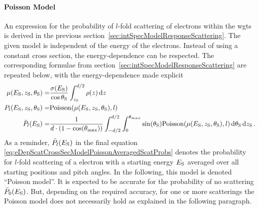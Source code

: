 \paragraph{Poisson Model}
An expression for the probability of $l$-fold scattering of electrons within the \gls{wgts} is derived in the previous section~\ref{sec:intSpecModelResponseScattering}. The given model is independent of the energy of the electrons. Instead of using a constant cross section, the energy-dependence can be respected. The corresponding formulae from section~\ref{sec:intSpecModelResponseScattering} are repeated below, with the energy-dependence made explicit
\begin{subequations}
\label{eq:eDepScatCrossSecModelPoisson}
\begin{align}
    \mu(E_\mathrm{S},z_\mathrm{S},\theta_\mathrm{S}) =&
    \frac{\sigma(E_\mathrm{S})}{\cos\theta_\mathrm{S}}
    \int_{z_\mathrm{S}}^{d/2} \rho(z)\mathop{}\!\mathrm{d} z \label{eq:energydepScatProbsPoissonExpectedScatCount} \\
    P_l(E_\mathrm{S},z_\mathrm{S},\theta_\mathrm{S}) =&
    \mathrm{Poisson}(\mu(E_\mathrm{S},z_\mathrm{S},\theta_\mathrm{S}),l) \label{eq:eDepScatCrossSecModelPoissonNonAveragedScatProbs} \\
    \bar{P}_l(E_\mathrm{S}) =&
    \frac{1}{d \cdot (1-\cos(\theta_\mathrm{max}))} 
      \int_{-d/2}^{d/2}  
          \int_{0}^{\theta_{max}} 
            \sin(\theta_\mathrm{S})
            \mathrm{Poisson}(\mu(E_\mathrm{S},z_\mathrm{S},\theta_\mathrm{S}),l)
          \mathop{}\!\mathrm{d}\theta_\mathrm{S}
      \mathop{}\!\mathrm{d}z_\mathrm{S}
      \label{eq:eDepScatCrossSecModelPoissonAveragedScatProbs}
    \text{\,.}
\end{align}
\end{subequations}
As a reminder, $\bar{P}_l(E_\mathrm{S})$ in the final equation \eqref{eq:eDepScatCrossSecModelPoissonAveragedScatProbs} denotes the probability for $l$-fold scattering of a electron with a starting energy $E_\mathrm{S}$ averaged over all starting positions and pitch angles. In the following, this model is denoted ``Poisson model''. It is expected to be accurate for the probability of no scattering $\bar{P}_0(E_\mathrm{S})$. But, depending on the required accuracy, for one or more scatterings the Poisson model does not necessarily hold as explained in the following paragraph.

